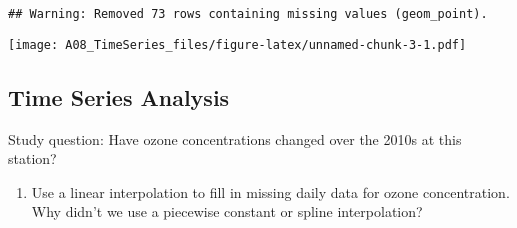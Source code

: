 \documentclass[]{article}
\newenvironment{Shaded}{\begin{snugshade}}{\end{snugshade}}
\newcommand{\DataTypeTok}[1]{\textcolor[rgb]{0.13,0.29,0.53}{#1}}
\newcommand{\DecValTok}[1]{\textcolor[rgb]{0.00,0.00,0.81}{#1}}
\newcommand{\FloatTok}[1]{\textcolor[rgb]{0.00,0.00,0.81}{#1}}
\newcommand{\KeywordTok}[1]{\textcolor[rgb]{0.13,0.29,0.53}{\textbf{#1}}}
\newcommand{\NormalTok}[1]{#1}
\newcommand{\OperatorTok}[1]{\textcolor[rgb]{0.81,0.36,0.00}{\textbf{#1}}}
\newcommand{\StringTok}[1]{\textcolor[rgb]{0.31,0.60,0.02}{#1}}
\providecommand{\tightlist}{%
  \setlength{\itemsep}{0pt}\setlength{\parskip}{0pt}}
\begin{document}
\begin{Shaded}
\end{Shaded}

\begin{verbatim}
## Warning: Removed 73 rows containing missing values (geom_point).
\end{verbatim}

\texttt{[image: A08\_TimeSeries\_files/figure-latex/unnamed-chunk-3-1.pdf]}

\hypertarget{time-series-analysis}{%
\subsection{Time Series Analysis}\label{time-series-analysis}}

Study question: Have ozone concentrations changed over the 2010s at this
station?

\begin{enumerate}
\def\labelenumi{\arabic{enumi}.}
\setcounter{enumi}{7}
\tightlist
\item
  Use a linear interpolation to fill in missing daily data for ozone
  concentration. Why didn't we use a piecewise constant or spline
  interpolation?
\end{enumerate}
\end{document}

